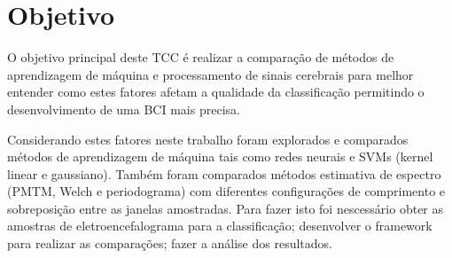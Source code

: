 \section{Objetivo}
O objetivo principal deste  \ac{TCC} \'e realizar a comparação de m\'etodos de aprendizagem de m\'aquina e processamento de sinais cerebrais para melhor entender como estes fatores afetam a qualidade da classifica\c{c}\~ao permitindo o desenvolvimento de uma \acs{BCI} mais precisa.
\par 
Considerando estes fatores neste trabalho foram explorados e comparados m\'etodos de aprendizagem de m\'aquina tais como redes neurais e SVMs (kernel linear e gaussiano). Tamb\'em foram comparados m\'etodos estimativa de espectro (PMTM, Welch e periodograma) com diferentes configura\c{c}\~oes de comprimento e sobreposi\c{c}\~ao entre as janelas amostradas.
Para fazer isto foi nescess\'ario obter as amostras de eletroencefalograma para a classifica\c{c}\~ao;
desenvolver o framework para realizar as compara\c{c}\~oes; fazer a an\'alise dos resultados.

